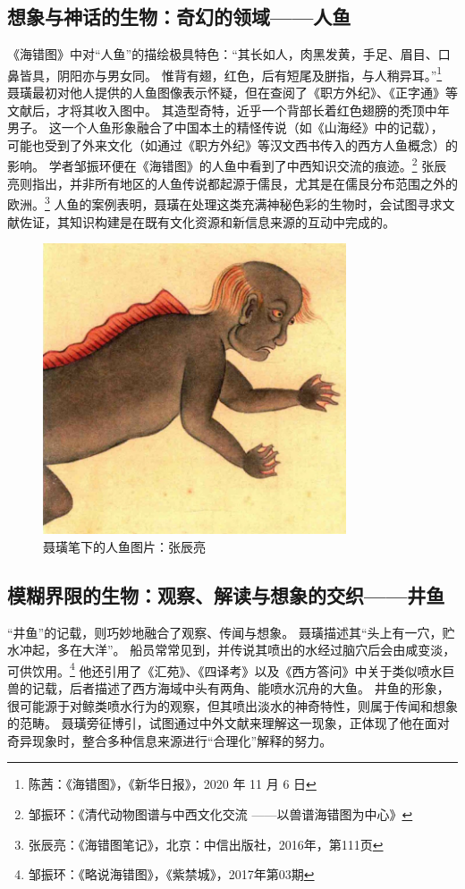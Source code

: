\documentclass{source/Paper}
\begin{document}
\subsection{想象与神话的生物：奇幻的领域——人鱼}
《海错图》中对“人鱼”的描绘极具特色：“其长如人，肉黑发黄，手足、眉目、口鼻皆具，阴阳亦与男女同。
惟背有翅，红色，后有短尾及胼指，与人稍异耳。”\footnote{陈茜：《海错图》，《新华日报》，2020 年 11 月 6 日}
聂璜最初对他人提供的人鱼图像表示怀疑，但在查阅了《职方外纪》、《正字通》等文献后，才将其收入图中。
其造型奇特，近乎一个背部长着红色翅膀的秃顶中年男子。
这一个人鱼形象融合了中国本土的精怪传说（如《山海经》中的记载），
可能也受到了外来文化（如通过《职方外纪》等汉文西书传入的西方人鱼概念）的影响。
学者邹振环便在《海错图》的人鱼中看到了中西知识交流的痕迹。\footnote{邹振环：《清代动物图谱与中西文化交流 ——以\textlangle 兽谱\textrangle \textlangle 海错图\textrangle 为中心》}
张辰亮则指出，并非所有地区的人鱼传说都起源于儒艮，尤其是在儒艮分布范围之外的欧洲。\footnote{张辰亮：《海错图笔记》，北京：中信出版社，2016年，第111页}
人鱼的案例表明，聂璜在处理这类充满神秘色彩的生物时，会试图寻求文献佐证，其知识构建是在既有文化资源和新信息来源的互动中完成的。
\begin{figure}[H]
    \centering
    \includegraphics[width=0.8\textwidth]{fig/人鱼.png}
    \caption{聂璜笔下的人鱼\;图片：张辰亮}
    \label{fig:人鱼}
\end{figure}
\subsection{模糊界限的生物：观察、解读与想象的交织——井鱼}
“井鱼”的记载，则巧妙地融合了观察、传闻与想象。
聂璜描述其“头上有一穴，贮水冲起，多在大洋”。
船员常常见到，并传说其喷出的水经过脑穴后会由咸变淡，可供饮用。\footnote{邹振环：《略说海错图》，《紫禁城》，2017年第03期}
他还引用了《汇苑》、《四译考》以及《西方答问》中关于类似喷水巨兽的记载，后者描述了西方海域中头有两角、能喷水沉舟的大鱼。
井鱼的形象，很可能源于对鲸类喷水行为的观察，但其喷出淡水的神奇特性，则属于传闻和想象的范畴。
聂璜旁征博引，试图通过中外文献来理解这一现象，正体现了他在面对奇异现象时，整合多种信息来源进行“合理化”解释的努力。
\end{document}
